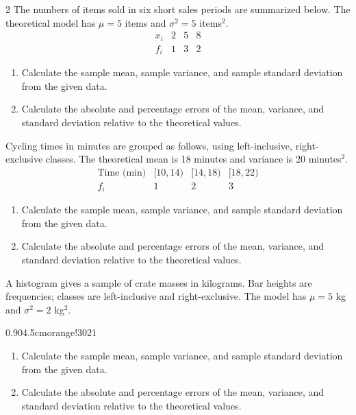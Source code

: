 \begin{multicols}{2}
The numbers of items sold in six short sales periods are summarized below.
The theoretical model has $\mu=5$ items and $\sigma^2=5$ items$^2$.
\[
\begin{array}{c|rrr}x_i&2&5&8\\\hline f_i&1&3&2\end{array}
\]
\begin{enumerate}[label=\textbf{(\alph*)}]
\item Calculate the sample mean, sample variance, and sample standard deviation from the given data. 
\item Calculate the absolute and percentage errors of the mean, variance, and standard deviation relative to the theoretical values. 
\end{enumerate}


\columnbreak

Cycling times in minutes are grouped as follows, using left-inclusive,
right-exclusive classes. The theoretical mean is 18 minutes and variance
is 20 minutes$^2$.
\[
\begin{array}{c|rrr}
\text{Time (min)}&[10,14)&[14,18)&[18,22)\\\hline
f_i&1&2&3
\end{array}
\]
\begin{enumerate}[label=\textbf{(\alph*)}]
\item Calculate the sample mean, sample variance, and sample standard deviation from the given data. 
\item Calculate the absolute and percentage errors of the mean, variance, and standard deviation relative to the theoretical values. 
\end{enumerate}

A histogram gives a sample of crate masses in kilograms. Bar heights are
frequencies; classes are left-inclusive and right-exclusive. The model
has $\mu=5$ kg and $\sigma^2=2$ kg$^2$.
\begin{center}
{0.90\linewidth}{4.5cm}{orange!30}{2}{1}
\end{center}
\begin{enumerate}[label=\textbf{(\alph*)}]
\item Calculate the sample mean, sample variance, and sample standard deviation from the given data. 
\item Calculate the absolute and percentage errors of the mean, variance, and standard deviation relative to the theoretical values. 
\end{enumerate}

\end{multicols}

